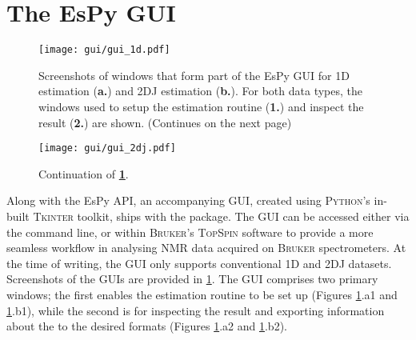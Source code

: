 \section{The \acs{EsPy} \acs{GUI}}
\begin{figure}
    \centering
    \texttt{[image: gui/gui\_1d.pdf]}
    \caption[
        Screenshots of the \acs{EsPy} \acs{GUI} for \acs{1D} and \acs{2DJ} estimation.
    ]{
        Screenshots of windows that form part of the \ac{EsPy} \ac{GUI} for
        \ac{1D} estimation (\textbf{a.}) and \ac{2DJ} estimation (\textbf{b.}).
        For both data types, the windows used to setup the estimation routine
        (\textbf{1.}) and inspect the result (\textbf{2.}) are shown.
        (Continues on the next page)
    }
    \label{fig:gui}
\end{figure}
\begin{figure}%
    \ContinuedFloat
    \centering
    \texttt{[image: gui/gui\_2dj.pdf]}
    \caption*{Continuation of \textbf{\cref{fig:gui}}.}
\end{figure}
Along with the \ac{EsPy} \ac{API}, an accompanying \ac{GUI}, created using
\textsc{Python}'s in-built \textsc{Tkinter} toolkit\cite{tkinter}, ships with
the package. The \ac{GUI} can be accessed either via the command line, or within
\textsc{Bruker}'s \textsc{TopSpin} software to provide a more seamless workflow
in analysing \ac{NMR} data acquired on \textsc{Bruker} spectrometers.
At the time of writing, the \ac{GUI} only supports conventional \ac{1D}
and \ac{2DJ} datasets. Screenshots of the \acp{GUI} are provided in
\cref{fig:gui}.
The \ac{GUI} comprises two primary windows; the first enables the estimation
routine to be set up (Figures \ref{fig:gui}.a1 and \ref{fig:gui}.b1), while the
second is for inspecting the result and exporting information about the to the
desired formats (Figures \ref{fig:gui}.a2 and \ref{fig:gui}.b2).

